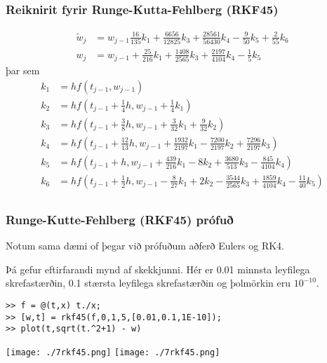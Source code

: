 \documentclass[icelandic,a4paper,12pt]{article}
\begin{document}
\subsubsection{Reiknirit fyrir Runge-Kutta-Fehlberg (RKF45)}
 \begin{align*}
  \tilde w_j &= w_{j-1} \frac{16}{135} k_1 + \frac{6656}{12825}k_3 + \frac{28561}{56430}k_4
  - \frac{9}{50}k_5 + \frac{2}{55}k_6\\
  w_j &= w_{j-1} + \frac{25}{216}k_1 + \frac{1408}{2565}k_3 + \frac{2197}{4104}k_4 - \frac 15 k_5
 \end{align*}
 \pause þar sem
 \begin{align*}
  k_1 &= hf(t_{j-1},w_{j-1}) \\  
  k_2 &= hf\left( t_{j-1}+\frac 14h, w_{j-1}+\frac 14k_1          \right)\\
  k_3 &= hf\left( t_{j-1}+\frac 38h, w_{j-1}+\frac 3{32}k_1 + \frac 9{32}k_2\right)\\
  k_4 &= hf\left( t_{j-1}+\frac{12}{13}h, w_{j-1} + \frac{1932}{2197}k_1 
  - \frac{7200}{2197}k_2 + \frac{7296}{2197}k_3 \right)\\
  k_5 &= hf\left( t_{j-1} +h, w_{j-1} + \frac{439}{216}k_1 - 8k_2+\frac{3680}{513}k_3 
  -\frac{845}{4104}k_4\right)\\
  k_6 &= hf\left( t_{j-1} +\frac 12h, w_{j-1} - \frac 8{27}k_1 + 2k_2 -\frac{3544}{2565}k_3
  +\frac{1859}{4104}k_4 - \frac{11}{40}k_5\right)\\
 \end{align*}

 



\subsubsection{Runge-Kutte-Fehlberg (RKF45) prófuð}
Notum sama dæmi of þegar við prófuðum aðferð Eulers og RK4.

Þá gefur eftirfarandi mynd af skekkjunni.
Hér er 0.01 minnsta leyfilega skrefastærðin, 0.1 stærsta leyfilega skrefastærðin
og þolmörkin eru $10^{-10}$. 
\begin{verbatim}
>> f = @(t,x) t./x;
>> [w,t] = rkf45(f,0,1,5,[0.01,0.1,1E-10]);
>> plot(t,sqrt(t.^2+1) - w)
\end{verbatim}
{\texttt{[image: ./7rkf45.png]}}
{\texttt{[image: ./7rkf45.png]}}


\end{document}
